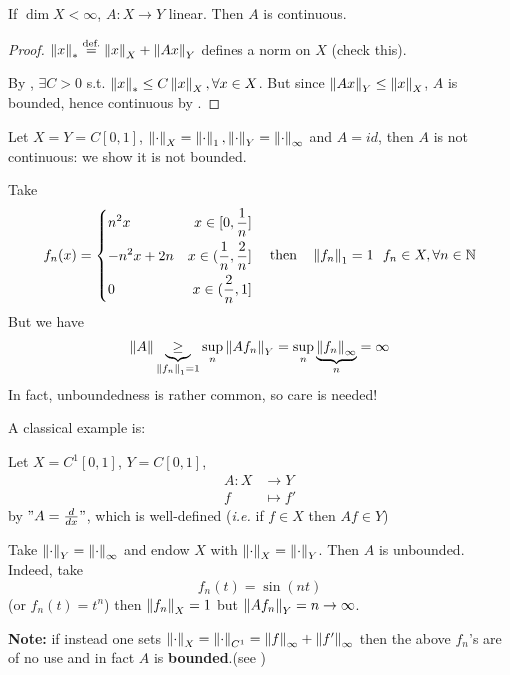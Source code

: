 \documentclass{article}
\begin{document}
\begin{corollary}
    If $\dim X < \infty$, $A: X\to Y$ linear. Then $A$ is continuous.
\end{corollary}  
\begin{proof}
    $\left\|{x}\right\|_* \stackrel{\text{def.}}{=} \left\|{x}\right\|_X + \left\|{Ax}\right\|_Y$ defines a norm on $X$ (check this).  
    
    By , $\exists C>0$ s.t. $\left\|{x}\right\|_* \leq C \left\|{x}\right\|_X, \forall x \in X$. But since $\left\|{Ax}\right\|_Y \leq \left\|{x}\right\|_X$, $A$ is bounded, hence continuous by .
\end{proof}

\begin{example}
    Let $X=Y=C[0,1]$, $\left\|{\cdot}\right\|_X=\left\|{\cdot}\right\|_1, \left\|{\cdot}\right\|_Y=\left\|{\cdot}\right\|_{\infty}$ and $A=id$, then $A$ is not continuous: we show it is not bounded.  

    Take 
    \begin{equation}\nonumber
f_n(x)=\left\{
\begin{aligned}
    &{n^2x} &x\in[0,\frac{1}{n}]\\
    &{-n^2x+2n} &x\in(\frac{1}{n},\frac{2}{n}]\\
    &0 &x\in(\frac{2}{n},1]\\
\end{aligned}
\right.\quad\text{then}\quad\left\|{f_n}\right\|_1=1  \  \ f_n \in X, \forall n \in \mathbb{N}
\end{equation}
But we have  
$$
\left\|{A}\right\| \underbrace{\geq}_{\left\|{f_n}\right\|_1=1} \sup_n \left\|{Af_n}\right\|_Y = \sup_n \underbrace{\left\|{f_n}\right\|_{\infty}}_n = \infty
$$
In fact, unboundedness is rather common, so care is needed!  
\end{example}  

A classical example is:  

\begin{example}
    Let $X=C^1[0,1]$, $Y=C[0,1]$, 
    \begin{align*}
        A: X &\to Y \\
        f &\mapsto f'
    \end{align*}
    by $"A = \frac{d}{dx}"$, which is well-defined (\textit{i.e.} if $f\in X$ then $Af \in Y$)

    Take $\left\|{\cdot}\right\|_Y = \left\|{\cdot}\right\|_{\infty}$ and endow $X$ with $\left\|{\cdot}\right\|_X = \left\|{\cdot}\right\|_Y$. Then $A$ is unbounded. Indeed, take  
    $$
    f_n(t) = \sin(nt) 
    $$
    (or $f_n(t)=t^n$) then $\left\|{f_n}\right\|_X=1$ but $\left\|{Af_n}\right\|_Y=n \to \infty$.

    \textbf{Note:} if instead one sets $\left\|{\cdot}\right\|_X = \left\|{\cdot}\right\|_{C^1}=\left\|{f}\right\|_{\infty}+\left\|{f'}\right\|_{\infty}$ then the above $f_n$'s are of no use and in fact $A$ is {\bf{bounded}}.(see )
\end{example}  
\end{document}
